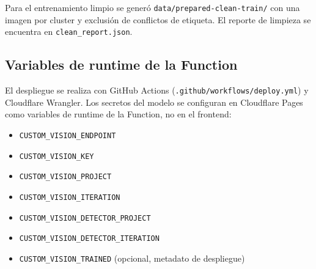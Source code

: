Para el entrenamiento limpio se generó \texttt{data/prepared-clean-train/} con una
imagen por cluster y exclusión de conflictos de etiqueta. El reporte de limpieza se
encuentra en \texttt{clean\_report.json}.

\subsection{Variables de runtime de la Function}

El despliegue se realiza con GitHub Actions (\texttt{.github/workflows/deploy.yml})
y Cloudflare Wrangler. Los secretos del modelo se configuran en Cloudflare Pages
como variables de runtime de la Function, no en el frontend:

\begin{itemize}
  \item \texttt{CUSTOM\_VISION\_ENDPOINT}
  \item \texttt{CUSTOM\_VISION\_KEY}
  \item \texttt{CUSTOM\_VISION\_PROJECT}
  \item \texttt{CUSTOM\_VISION\_ITERATION}
  \item \texttt{CUSTOM\_VISION\_DETECTOR\_PROJECT}
  \item \texttt{CUSTOM\_VISION\_DETECTOR\_ITERATION}
  \item \texttt{CUSTOM\_VISION\_TRAINED} (opcional, metadato de despliegue)
\end{itemize}
